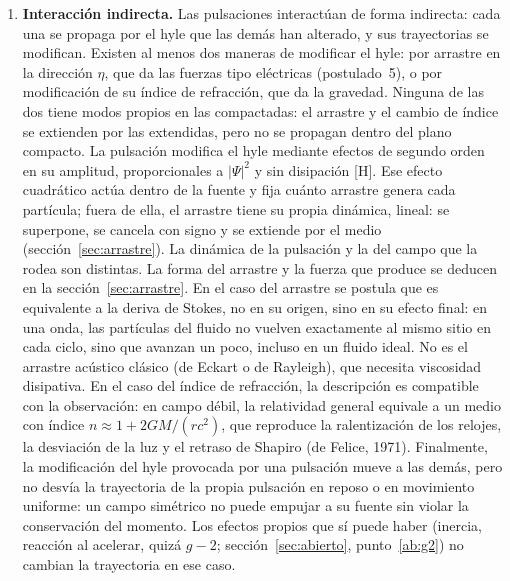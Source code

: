 \documentclass[11pt,a4paper]{article}
\newcommand{\st}[1]{\textup{[#1]}}
\begin{document}
\begin{enumerate}[label=\arabic*.,leftmargin=*]
patrón vuelve a ser igual tras media vuelta de la línea, pero el toro no: ha girado media vuelta, y eso se nota en el ángulo relativo con otro nudo (sección~\ref{sec:abierto}, punto~\ref{ab:espinor-nudo}). Sin un giro rápido, la textura es el hopfión estático de Faddeev--Skyrme, que es el que se simula en la sección~\ref{sec:extendidas}.

\item \textbf{Interacción indirecta.} Las pulsaciones interactúan de forma indirecta: cada una se propaga por el hyle que las demás han alterado, y sus trayectorias se modifican. Existen al menos dos maneras de modificar el hyle: por arrastre en la dirección $\eta$, que da las fuerzas tipo eléctricas (postulado~5), o por modificación de su índice de refracción, que da la gravedad. Ninguna de las dos tiene modos propios en las compactadas: el arrastre y el cambio de índice se extienden por las extendidas, pero no se propagan dentro del plano compacto. La pulsación modifica el hyle mediante efectos de segundo orden en su amplitud, proporcionales a $|\Psi|^2$ y sin disipación \st{H}. Ese efecto cuadrático actúa dentro de la fuente y fija cuánto arrastre genera cada partícula; fuera de ella, el arrastre tiene su propia dinámica, lineal: se superpone, se cancela con signo y se extiende por el medio (sección~\ref{sec:arrastre}). La dinámica de la pulsación y la del campo que la rodea son distintas. La forma del arrastre y la fuerza que produce se deducen en la sección~\ref{sec:arrastre}. En el caso del arrastre se postula que es equivalente a la deriva de Stokes, no en su origen, sino en su efecto final: en una onda, las partículas del fluido no vuelven exactamente al mismo sitio en cada ciclo, sino que avanzan un poco, incluso en un fluido ideal. No es el arrastre acústico clásico (de Eckart o de Rayleigh), que necesita viscosidad disipativa. En el caso del índice de refracción, la descripción es compatible con la observación: en campo débil, la relatividad general equivale a un medio con índice $n\approx 1+2GM/(rc^2)$, que reproduce la ralentización de los relojes, la desviación de la luz y el retraso de Shapiro (de Felice, 1971). Finalmente, la modificación del hyle provocada por una pulsación mueve a las demás, pero no desvía la trayectoria de la propia pulsación en reposo o en movimiento uniforme: un campo simétrico no puede empujar a su fuente sin violar la conservación del momento. Los efectos propios que sí puede haber (inercia, reacción al acelerar, quizá $g-2$; sección~\ref{sec:abierto}, punto~\ref{ab:g2}) no cambian la trayectoria en ese caso.


\end{enumerate}
\end{document}
